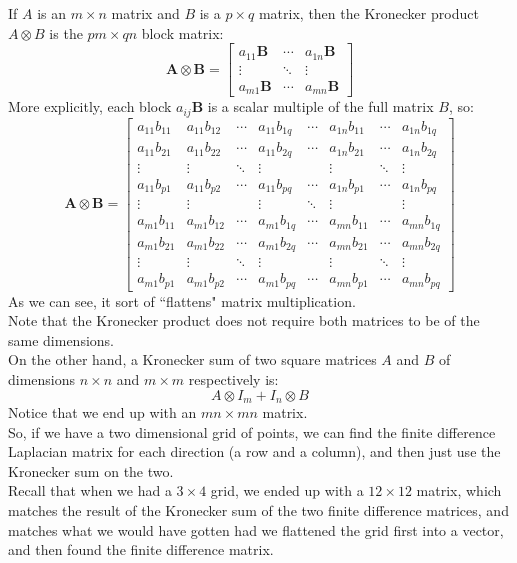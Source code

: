 \documentclass[12pt]{article}
\begin{document}
If $ A $ is an $m \times n$ matrix and $B$ 
is a $ p \times q$ matrix, 
then the Kronecker product $A \otimes B$ 
is the $ pm \times qn$ block matrix:
\[ \mathbf{A} \otimes \mathbf{B} = 
\begin{bmatrix}
a_{11} \mathbf{B} & \cdots & a_{1n} \mathbf{B} \\
\vdots & \ddots & \vdots \\
a_{m1} \mathbf{B} & \cdots & a_{mn} \mathbf{B}
\end{bmatrix} \]
More explicitly, each block $ a_{ij} \mathbf{B} $ 
is a scalar multiple of the full matrix $B$, so:
\[\mathbf{A} \otimes \mathbf{B} =
\begin{bmatrix}
a_{11} b_{11} & a_{11} b_{12} & \cdots & a_{11} b_{1q} & \cdots & a_{1n} b_{11} & \cdots & a_{1n} b_{1q} \\
a_{11} b_{21} & a_{11} b_{22} & \cdots & a_{11} b_{2q} & \cdots & a_{1n} b_{21} & \cdots & a_{1n} b_{2q} \\
\vdots & \vdots & \ddots & \vdots & & \vdots & \ddots & \vdots \\
a_{11} b_{p1} & a_{11} b_{p2} & \cdots & a_{11} b_{pq} & \cdots & a_{1n} b_{p1} & \cdots & a_{1n} b_{pq} \\
\vdots & \vdots & & \vdots & \ddots & \vdots & & \vdots \\
a_{m1} b_{11} & a_{m1} b_{12} & \cdots & a_{m1} b_{1q} & \cdots & a_{mn} b_{11} & \cdots & a_{mn} b_{1q} \\
a_{m1} b_{21} & a_{m1} b_{22} & \cdots & a_{m1} b_{2q} & \cdots & a_{mn} b_{21} & \cdots & a_{mn} b_{2q} \\
\vdots & \vdots & \ddots & \vdots & & \vdots & \ddots & \vdots \\
a_{m1} b_{p1} & a_{m1} b_{p2} & \cdots & a_{m1} b_{pq} & \cdots & a_{mn} b_{p1} & \cdots & a_{mn} b_{pq}
\end{bmatrix} \]
As we can see, it sort of ``flattens"
matrix multiplication. \\
Note that the Kronecker product
does not require both matrices
to be of the same dimensions. \\

On the other hand, a Kronecker
sum of two square matrices $A$
and $B$ of dimensions $n \times n$
and $m \times m$ respectively
is:
\[ A \otimes I_m + I_n \otimes B \]
Notice that we end up with an $mn \times mn$
matrix. \\

So, if we have a two dimensional grid of points,
we can find the finite difference Laplacian
matrix for each direction (a row
and a column), and then just
use the Kronecker sum on the two. \\
Recall that when we had a $3 \times 4$ grid,
we ended up with a $12 \times 12$ matrix, 
which matches the result of the Kronecker
sum of the two finite difference matrices,
and matches what we would have gotten
had we flattened the grid first into
a vector, and then found the finite
difference matrix. \\
\end{document}
